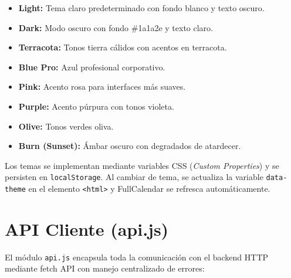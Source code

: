 \begin{itemize}
    \item \textbf{Light:} Tema claro predeterminado con fondo blanco y texto oscuro.
    \item \textbf{Dark:} Modo oscuro con fondo \#1a1a2e y texto claro.
    \item \textbf{Terracota:} Tonos tierra c\'alidos con acentos en terracota.
    \item \textbf{Blue Pro:} Azul profesional corporativo.
    \item \textbf{Pink:} Acento rosa para interfaces m\'as suaves.
    \item \textbf{Purple:} Acento p\'urpura con tonos violeta.
    \item \textbf{Olive:} Tonos verdes oliva.
    \item \textbf{Burn (Sunset):} \'Ambar oscuro con degradados de atardecer.
\end{itemize}

Los temas se implementan mediante variables CSS (\textit{Custom Properties}) y se persisten en \texttt{localStorage}. Al cambiar de tema, se actualiza la variable \texttt{data-theme} en el elemento \texttt{<html>} y FullCalendar se refresca autom\'aticamente.

\section{API Cliente (api.js)}

El m\'odulo \texttt{api.js} encapsula toda la comunicaci\'on con el backend HTTP mediante fetch API con manejo centralizado de errores:

